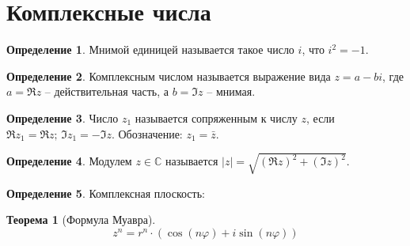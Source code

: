 \documentclass[12pt]{article}
\theoremstyle{definition}
\newtheorem{theorem}{Теорема}[section]
\newtheorem{definition}{Определение}
\newcommand{\clx}{\mathbb{C}}
\begin{document}
    \section{Комплексные числа}
    \begin{definition}
        Мнимой единицей называется такое число $i$, что $i^2=-1$.
    \end{definition}
    \begin{definition}
        Комплексным числом называется выражение вида $z=a-bi$, где $a=\Re z$ – действительная часть, а $b=\Im z$ – мнимая.
    \end{definition}
    \begin{definition}
        Число $z_1$ называется сопряженным к числу $z$, если $\Re z_1=\Re z;\,\Im z_1=-\Im z$. Обозначение: $z_1=\bar{z}$.
    \end{definition}
    \begin{definition}
        Модулем $z\in \clx$ называется $|z|=\sqrt{(\Re z)^2+(\Im z)^2}$.
    \end{definition}
    \begin{definition}
        Комплексная плоскость:
        \begin{center}
        \end{center}
    \end{definition}
    \begin{theorem}[Формула Муавра]
        $$z^n=r^n\cdot(\cos(n\varphi)+i\sin(n\varphi))$$
    \end{theorem}
\end{document}
